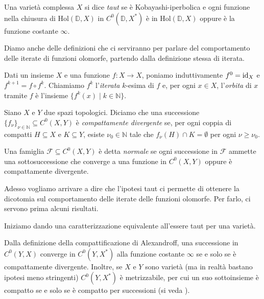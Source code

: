 \begin{defn}
    Una varietà complessa $X$ si dice \textit{taut} se è Kobayashi-iperbolica e ogni funzione nella chiusura di $\text{Hol}(\mathbb{D},X)$ in $C^0(\mathbb{D},X^*)$ è in $\text{Hol}(\mathbb{D},X)$ oppure è la funzione costante $\infty$.
\end{defn}

Diamo anche delle definizioni che ci serviranno per parlare del comportamento delle iterate di funzioni olomorfe, partendo dalla definizione stessa di iterata.

\begin{defn}
    Dati un insieme $X$ e una funzione $f:X\longrightarrow X$, poniamo induttivamente $f^0=\operatorname{id}_X$ e $f^{k+1}=f\circ f^k$. Chiamiamo $f^k$ l'\textit{iterata} $k$-esima di $f$ e, per ogni $x \in X$, l'\textit{orbita} di $x$ tramite $f$ è l'insieme $\{f^k(x)\mid k \in \mathbb{N}\}$.
\end{defn}

\begin{defn}
    Siano $X$ e $Y$ due spazi topologici. Diciamo che una successione $\{f_{\nu}\}_{\nu \in \mathbb{N}} \subseteq C^0(X,Y)$ è \textit{compattamente divergente} se, per ogni coppia di compatti $H\subseteq X$ e $K\subseteq Y$, esiste $\nu_0 \in \mathbb{N}$ tale che $f_\nu(H)\cap K=\emptyset$ per ogni $\nu \ge \nu_0$.

    Una famiglia $\mathcal{F} \subseteq C^0(X,Y)$ è detta \textit{normale} se ogni successione in $\mathcal{F}$ ammette una sottosuccessione che converge a una funzione in $C^0(X,Y)$ oppure è compattamente divergente.
\end{defn}

Adesso vogliamo arrivare a dire che l'ipotesi taut ci permette di ottenere la dicotomia sul comportamento delle iterate delle funzioni olomorfe. Per farlo, ci servono prima alcuni risultati.

Iniziamo dando una caratterizzazione equivalente all'essere taut per una varietà.

\begin{oss} \label{c0yx}
    Dalla definizione della compattificazione di Alexandroff, una successione in $C^0(Y,X)$ converge in $C^0(Y,X^*)$ alla funzione costante $\infty$ se e solo se è compattamente divergente. Inoltre, se $X$ e $Y$ sono varietà (ma in realtà bastano ipotesi meno stringenti) $C^0(Y,X^*)$ è metrizzabile, per cui un suo sottoinsieme è compatto se e solo se è compatto per successioni (si veda \cite[Section 1]{A3}).
\end{oss}

